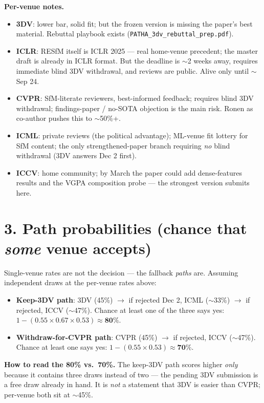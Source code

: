 \documentclass[11pt]{article}
\newcommand{\code}[1]{\texttt{\small #1}}
\begin{document}
\textbf{Per-venue notes.}
\begin{itemize}[leftmargin=1.4em,itemsep=2pt]
\item \textbf{3DV}: lower bar, solid fit; but the frozen version is missing the paper's best
material. Rebuttal playbook exists (\code{PATHA\_3dv\_rebuttal\_prep.pdf}).
\item \textbf{ICLR}: RESfM itself is ICLR 2025 --- real home-venue precedent; the master draft is
already in ICLR format. But the deadline is $\sim$2 weeks away, requires immediate blind 3DV
withdrawal, and reviews are public. Alive only until $\sim$Sep 24.
\item \textbf{CVPR}: SfM-literate reviewers, best-informed feedback; requires blind 3DV
withdrawal; findings-paper / no-SOTA objection is the main risk. Ronen as co-author pushes this
to $\sim$50\%+.
\item \textbf{ICML}: private reviews (the political advantage); ML-venue fit lottery for SfM
content; the only strengthened-paper branch requiring \emph{no} blind withdrawal (3DV answers
Dec 2 first).
\item \textbf{ICCV}: home community; by March the paper could add dense-features results and the
VGPA composition probe --- the strongest version submits here.
\end{itemize}

\section*{3. Path probabilities (chance that \emph{some} venue accepts)}

Single-venue rates are not the decision --- the fallback \emph{paths} are. Assuming independent
draws at the per-venue rates above:

\begin{itemize}[leftmargin=1.4em,itemsep=4pt]
\item \textbf{Keep-3DV path}: 3DV (45\%) $\rightarrow$ if rejected Dec 2, ICML ($\sim$33\%)
$\rightarrow$ if rejected, ICCV ($\sim$47\%). Chance at least one of the three says yes:
$1-(0.55\times0.67\times0.53)\approx\mathbf{80\%}$.
\item \textbf{Withdraw-for-CVPR path}: CVPR (45\%) $\rightarrow$ if rejected, ICCV ($\sim$47\%).
Chance at least one says yes: $1-(0.55\times0.53)\approx\mathbf{70\%}$.
\end{itemize}

\textbf{How to read the 80\% vs.\ 70\%.} The keep-3DV path scores higher \emph{only} because it
contains three draws instead of two --- the pending 3DV submission is a free draw already in
hand. It is \emph{not} a statement that 3DV is easier than CVPR; per-venue both sit at
$\sim$45\%.
\end{document}
